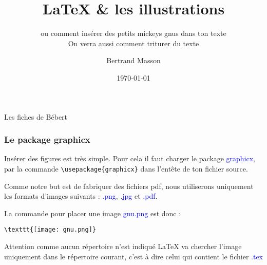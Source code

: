 \documentclass[10pt,hyperref={pdfpagemode=FullScreen},xcolor=dvipsnames,xcolor=table, xcolor=svgnames]{beamer}%
\newcommand{\latex}{\LaTeX\xspace}
\begin{document}
\author{Bertrand Masson}
\date{\today} 
\title{\LaTeX{} \& les illustrations}
 \subtitle{ou comment insérer des petits mickeys gnus dans ton texte\\On verra aussi comment triturer du texte}


 \begin{frame}{Les fiches de Bébert}
 \titlepage

 \end{frame}


  \begin{frame}[fragile]
  \frametitle{Le package graphicx}
Insérer des figures est très simple. Pour cela il faut charger le package \textcolor{blue}{graphicx}, par la commande
{\color{blue}\verb"\usepackage{graphicx}"} dans l'entête de ton fichier source.
\par
  Comme notre but est de fabriquer des fichiers pdf, nous utiliserons uniquement les formats d'images suivants : \textcolor{blue}{.png}, \textcolor{blue}{.jpg} et \textcolor{blue}{.pdf}.\par  La commande pour placer une image \textcolor{blue}{gnu.png} est donc :
\par\bigskip
{\color{blue}\verb"\texttt{[image: gnu.png]}"}\par
\begin{alertblock}{Attention}
 comme aucun répertoire n'est indiqué \latex va chercher l'image uniquement dans le répertoire courant, c'est à dire celui qui contient le fichier \textcolor{blue}{.tex}
\end{alertblock}
\end{frame}
\end{document}
